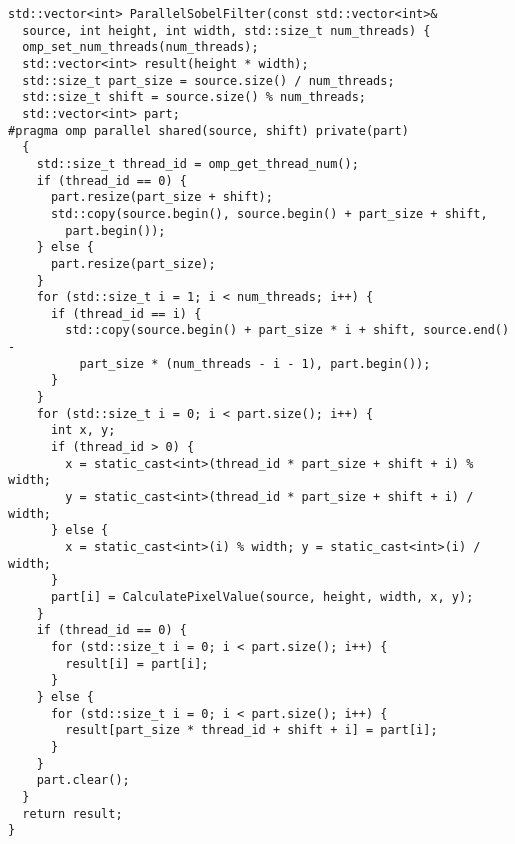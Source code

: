 \documentclass[12pt]{article}
\begin{document}
\begin{lstlisting}
std::vector<int> ParallelSobelFilter(const std::vector<int>&
  source, int height, int width, std::size_t num_threads) {
  omp_set_num_threads(num_threads);
  std::vector<int> result(height * width);
  std::size_t part_size = source.size() / num_threads;
  std::size_t shift = source.size() % num_threads;
  std::vector<int> part;
#pragma omp parallel shared(source, shift) private(part)
  {
    std::size_t thread_id = omp_get_thread_num();
    if (thread_id == 0) {
      part.resize(part_size + shift);
      std::copy(source.begin(), source.begin() + part_size + shift,
        part.begin());
    } else {
      part.resize(part_size);
    }
    for (std::size_t i = 1; i < num_threads; i++) {
      if (thread_id == i) {
        std::copy(source.begin() + part_size * i + shift, source.end() -
          part_size * (num_threads - i - 1), part.begin());
      }
    }
    for (std::size_t i = 0; i < part.size(); i++) {
      int x, y;
      if (thread_id > 0) {
        x = static_cast<int>(thread_id * part_size + shift + i) % width;
        y = static_cast<int>(thread_id * part_size + shift + i) / width;
      } else {
        x = static_cast<int>(i) % width; y = static_cast<int>(i) / width;
      }
      part[i] = CalculatePixelValue(source, height, width, x, y);
    }
    if (thread_id == 0) {
      for (std::size_t i = 0; i < part.size(); i++) {
        result[i] = part[i];
      }
    } else {
      for (std::size_t i = 0; i < part.size(); i++) {
        result[part_size * thread_id + shift + i] = part[i];
      }
    }
    part.clear();
  }
  return result;
}
\end{lstlisting}
\end{document}
